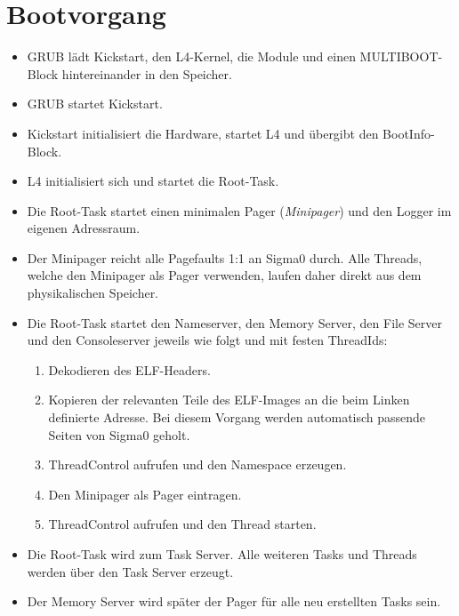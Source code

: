 \section{Bootvorgang}

\begin{itemize}
	\item GRUB lädt Kickstart, den L4-Kernel, die Module und einen MULTIBOOT-Block hintereinander in den Speicher.
	
	\item GRUB startet Kickstart.
	
	\item Kickstart initialisiert die Hardware, startet L4 und übergibt den BootInfo-Block.
	
	\item L4 initialisiert sich und startet die Root-Task.
	
	\item Die Root-Task startet einen minimalen Pager (\textit{Minipager}) und den Logger im eigenen Adressraum.
	
	\item Der Minipager reicht alle Pagefaults 1:1 an Sigma0 durch. Alle Threads, welche den Minipager als Pager verwenden, laufen daher direkt aus dem physikalischen Speicher.

	\item Die Root-Task startet den Nameserver, den Memory Server, den File Server  und den Consoleserver jeweils wie folgt und mit festen ThreadIds:
	\begin{enumerate}
		\item Dekodieren des ELF-Headers.
		\item Kopieren der relevanten Teile des ELF-Images an die beim Linken definierte Adresse. Bei diesem Vorgang werden automatisch passende Seiten von Sigma0 geholt.
		\item ThreadControl aufrufen und den Namespace erzeugen.
		\item Den Minipager als Pager eintragen.
		\item ThreadControl aufrufen und den Thread starten.
	\end{enumerate}
	
	\item Die Root-Task wird zum Task Server. Alle weiteren Tasks und Threads werden über den Task Server erzeugt.
	
	\item Der Memory Server wird später der Pager für alle neu erstellten Tasks sein.
	

\end{itemize}
